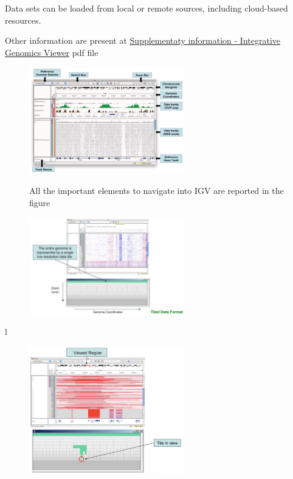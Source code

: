 Data sets can be loaded from local or remote sources, including cloud-based
resources. 

Other information are present at
\href{https://authors.library.caltech.edu/72234/2/nbt.1754-S1.pdf}{Supplementaty
information - Integrative Genomics Viewer} pdf file

\begin{figure}
    \caption{All the important elements to navigate into IGV are reported in the figure}
    \centering
    \includegraphics[width=0.6\textwidth]{IGVview.PNG}
    \label{IGVsee}
\end{figure}
\begin{figure}
    \caption{}
    \centering
    \includegraphics[width=0.6\textwidth]{Tiles.PNG}
    \label{Til}
\end{figure}l 

\begin{figure}
    \caption{}
    \centering
    \includegraphics[width=0.6\textwidth]{TileView.PNG}
    \label{img: TileV}
\end{figure}

